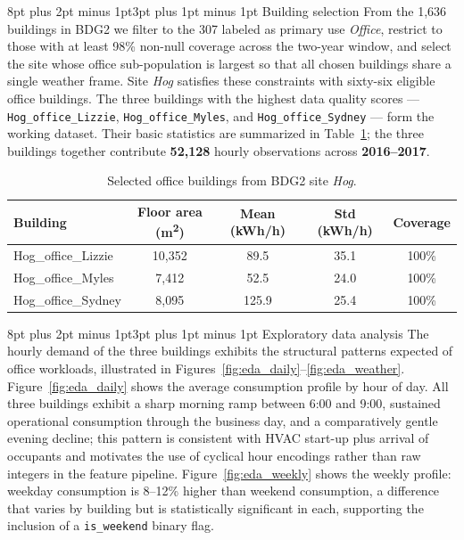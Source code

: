 \documentclass[12pt,a4paper,openany]{report}
\makeatletter
\renewcommand{\subsection}{\@startsection{subsection}{2}{\z@}%
  {8pt plus 2pt minus 1pt}{3pt plus 1pt minus 1pt}%
  {\normalfont\normalsize\bfseries}}
\makeatother
\begin{document}
\subsection{Building selection}
From the 1{,}636 buildings in BDG2 we filter to the 307 labeled as primary use \textit{Office}, restrict to those with at least 98\% non-null coverage across the two-year window, and select the site whose office sub-population is largest so that all chosen buildings share a single weather frame. Site \textit{Hog} satisfies these constraints with sixty-six eligible office buildings. The three buildings with the highest data quality scores --- \texttt{Hog\_office\_Lizzie}, \texttt{Hog\_office\_Myles}, and \texttt{Hog\_office\_Sydney} --- form the working dataset. Their basic statistics are summarized in Table~\ref{tab:building_stats}; the three buildings together contribute \textbf{52{,}128} hourly observations across \textbf{2016--2017}.

\begin{table}[!htb]
\centering
\caption{Selected office buildings from BDG2 site \textit{Hog}.}
\label{tab:building_stats}
\begin{tabular}{|l|c|c|c|c|}
\hline
\textbf{Building} & \textbf{Floor area (m\textsuperscript{2})} & \textbf{Mean (kWh/h)} & \textbf{Std (kWh/h)} & \textbf{Coverage} \\
\hline
Hog\_office\_Lizzie & 10{,}352 & 89.5 & 35.1 & 100\% \\
Hog\_office\_Myles & 7{,}412 & 52.5 & 24.0 & 100\% \\
Hog\_office\_Sydney & 8{,}095 & 125.9 & 25.4 & 100\% \\
\hline
\end{tabular}
\end{table}

\subsection{Exploratory data analysis}
The hourly demand of the three buildings exhibits the structural patterns expected of office workloads, illustrated in Figures~\ref{fig:eda_daily}--\ref{fig:eda_weather}. Figure~\ref{fig:eda_daily} shows the average consumption profile by hour of day. All three buildings exhibit a sharp morning ramp between 6:00 and 9:00, sustained operational consumption through the business day, and a comparatively gentle evening decline; this pattern is consistent with HVAC start-up plus arrival of occupants \cite{ref_taylor_short_term} and motivates the use of cyclical hour encodings rather than raw integers in the feature pipeline. Figure~\ref{fig:eda_weekly} shows the weekly profile: weekday consumption is 8--12\% higher than weekend consumption, a difference that varies by building but is statistically significant in each, supporting the inclusion of a \texttt{is\_weekend} binary flag.
\end{document}
